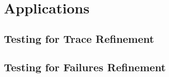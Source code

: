 \section{Applications}
\label{sec:case}




\subsection{Testing for Trace Refinement}
 



\subsection{Testing for Failures Refinement}
 


